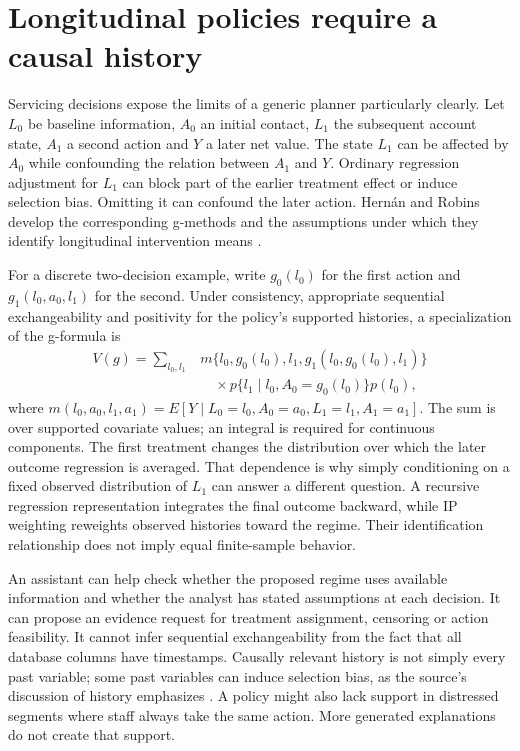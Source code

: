 \section{Longitudinal policies require a causal history}

Servicing decisions expose the limits of a generic planner particularly clearly.
Let $L_0$ be baseline information, $A_0$ an initial contact, $L_1$ the subsequent
account state, $A_1$ a second action and $Y$ a later net value. The state $L_1$ can
be affected by $A_0$ while confounding the relation between $A_1$ and $Y$.
Ordinary regression adjustment for $L_1$ can block part of the earlier treatment
effect or induce selection bias. Omitting it can confound the later action.
Hernán and Robins develop the corresponding g-methods and the assumptions under
which they identify longitudinal intervention means \cite{hernan2020}.

For a discrete two-decision example, write
$g_0(l_0)$ for the first action and
$g_1(l_0,a_0,l_1)$ for the second. Under consistency, appropriate sequential
exchangeability and positivity for the policy's supported histories, a
specialization of the g-formula is
\begin{align}
 V(g)=\sum_{l_0,l_1}&
 m\{l_0,g_0(l_0),l_1,g_1(l_0,g_0(l_0),l_1)\}\nonumber\\
 &\quad\times p\{l_1\mid l_0,A_0=g_0(l_0)\}p(l_0),
 \label{eq:la04-policy}
\end{align}
where $m(l_0,a_0,l_1,a_1)=E[Y\mid L_0=l_0,A_0=a_0,L_1=l_1,A_1=a_1]$.
The sum is over supported covariate values; an integral is required for
continuous components. The first treatment changes the distribution over which
the later outcome regression is averaged. That dependence is why simply
conditioning on a fixed observed distribution of $L_1$ can answer a different
question. A recursive regression representation integrates the final outcome
backward, while IP weighting reweights observed histories toward the regime.
Their identification relationship does not imply equal finite-sample behavior.

An assistant can help check whether the proposed regime uses available
information and whether the analyst has stated assumptions at each decision.
It can propose an evidence request for treatment assignment, censoring or action
feasibility. It cannot infer sequential exchangeability from the fact that all
database columns have timestamps. Causally relevant history is not simply every
past variable; some past variables can induce selection bias, as the source's
discussion of history emphasizes \cite{hernan2020}. A policy might also lack
support in distressed segments where staff always take the same action.
More generated explanations do not create that support.

